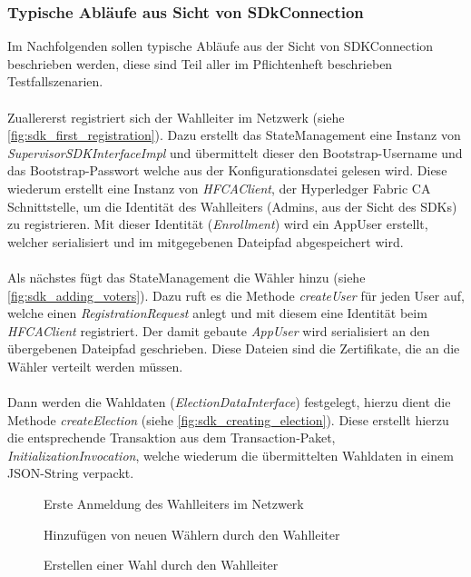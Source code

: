 \documentclass[parskip=full]{scrartcl}
\begin{document}
	\subsubsection{Typische Abläufe aus Sicht von SDkConnection}
	Im Nachfolgenden sollen typische Abläufe aus der Sicht von SDKConnection beschrieben werden, diese sind Teil aller im Pflichtenheft beschrieben Testfallszenarien. \\ \\
	Zuallererst registriert sich der Wahlleiter im Netzwerk (siehe \autoref{fig:sdk_first_registration}). Dazu erstellt das StateManagement eine Instanz von \textit{SupervisorSDKInterfaceImpl} und übermittelt dieser den Bootstrap-Username und das Bootstrap-Passwort welche aus der Konfigurationsdatei gelesen wird. Diese wiederum erstellt eine Instanz von \textit{HFCAClient}, der Hyperledger Fabric CA Schnittstelle, um die Identität des Wahlleiters (Admins, aus der Sicht des SDKs) zu registrieren. Mit dieser Identität (\textit{Enrollment}) wird ein AppUser erstellt, welcher serialisiert und im mitgegebenen Dateipfad abgespeichert wird. \\ \\
	Als nächstes fügt das StateManagement die Wähler hinzu (siehe \autoref{fig:sdk_adding_voters}). Dazu ruft es die Methode \textit{createUser} für jeden User auf, welche einen \textit{RegistrationRequest} anlegt und mit diesem eine Identität beim \textit{HFCAClient} registriert. Der damit gebaute \textit{AppUser} wird serialisiert an den übergebenen Dateipfad geschrieben. Diese Dateien sind die Zertifikate, die an die Wähler verteilt werden müssen. \\ \\
	Dann werden die Wahldaten (\textit{ElectionDataInterface}) festgelegt, hierzu dient die Methode \textit{createElection} (siehe \autoref{fig:sdk_creating_election}). Diese erstellt hierzu die entsprechende Transaktion aus dem Transaction-Paket, \textit{InitializationInvocation}, welche wiederum die übermittelten Wahldaten in einem JSON-String verpackt.
	
	\newpage
	\pagestyle{empty}
	\begin{sidewaysfigure}[!h]
		\centering
		\hspace{-100pt}
		\centerline{}
		\caption{Erste Anmeldung des Wahlleiters im Netzwerk}
		\label{fig:sdk_first_registration}
	\end{sidewaysfigure}
	\newpage
	\begin{sidewaysfigure}[!h]
		\centering
		\hspace{-100pt}
		\centerline{}
		\caption{Hinzufügen von neuen Wählern durch den Wahlleiter}
		\label{fig:sdk_adding_voters}
	\end{sidewaysfigure}
	\newpage
	\begin{sidewaysfigure}[!h]
		\centering
		\hspace{-100pt}
		\centerline{}
		\caption{Erstellen einer Wahl durch den Wahlleiter}
		\label{fig:sdk_creating_election}
	\end{sidewaysfigure}
	\newpage
\end{document}
